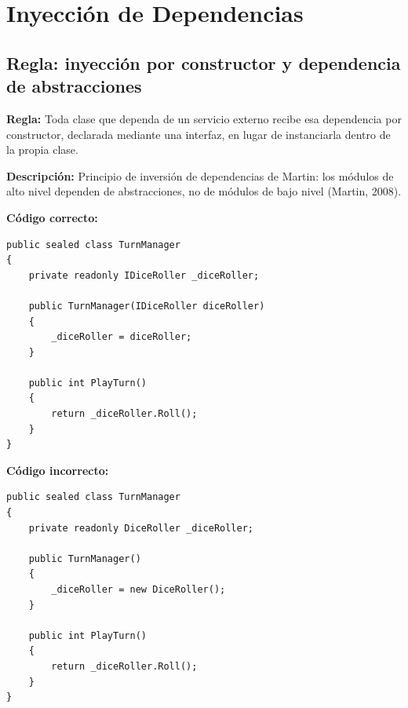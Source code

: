 \section{Inyección de Dependencias}

\subsection{Regla: inyección por constructor y dependencia de abstracciones}

\textbf{Regla:} Toda clase que dependa de un servicio externo recibe esa dependencia por constructor, declarada mediante una interfaz, en lugar de instanciarla dentro de la propia clase.

\textbf{Descripción:} Principio de inversión de dependencias de Martin: los módulos de alto nivel dependen de abstracciones, no de módulos de bajo nivel (Martin, 2008).

\textbf{Código correcto:}
\begin{lstlisting}[style=csharpstyle]
public sealed class TurnManager
{
    private readonly IDiceRoller _diceRoller;

    public TurnManager(IDiceRoller diceRoller)
    {
        _diceRoller = diceRoller;
    }

    public int PlayTurn()
    {
        return _diceRoller.Roll();
    }
}
\end{lstlisting}

\textbf{Código incorrecto:}
\begin{lstlisting}[style=csharpstyle]
public sealed class TurnManager
{
    private readonly DiceRoller _diceRoller;

    public TurnManager()
    {
        _diceRoller = new DiceRoller();
    }

    public int PlayTurn()
    {
        return _diceRoller.Roll();
    }
}
\end{lstlisting}
